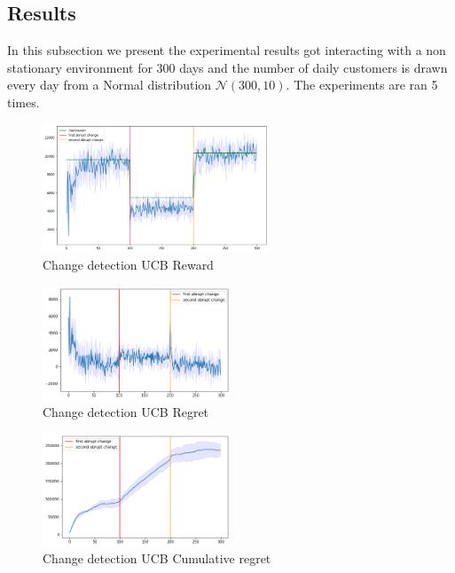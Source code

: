 \subsection{Results}
In this subsection we present the experimental results got interacting with a non stationary environment for 300 days and the number of daily customers is drawn every day from a Normal distribution $\mathcal{N}(300, 10)$. The experiments are ran 5 times.
\begin{figure}[ht]
    \begin{center}
    \includegraphics[width=0.6\textwidth]{img/rewards_active2.png}
    \caption{Change detection UCB Reward}
    \label{fig:reward61}
    \end{center}
\end{figure}
\begin{multicols}{2}
    \begin{figure}[H]
        \begin{center}
        \includegraphics[width=0.5\textwidth]{img/regret_active2.png}
        \caption{Change detection UCB Regret}
        \label{fig:regret61}
        \end{center}
    \end{figure}
    \columnbreak
    \begin{figure}[H]
        \begin{center}
        \includegraphics[width=0.5\textwidth]{img/cumulative_regret_active2.png}
        \caption{Change detection UCB Cumulative regret}
        \label{fig:cum_reg61}
        \end{center}
    \end{figure}
\end{multicols}

